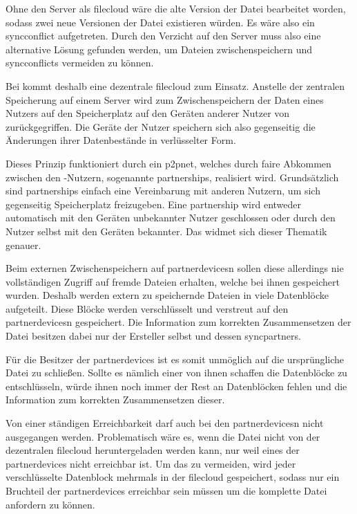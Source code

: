 Ohne den Server als \gls{filecloud} wäre die alte Version der Datei bearbeitet worden, sodass zwei
neue Versionen der Datei existieren würden. Es wäre also ein \gls{syncconflict} aufgetreten.
Durch den Verzicht auf den Server muss also eine alternative Lösung gefunden werden,
um Dateien zwischenspeichern und \glspl{syncconflict} vermeiden zu können.

Bei \sblit kommt deshalb eine dezentrale \gls{filecloud} zum Einsatz. Anstelle
der zentralen Speicherung auf einem Server wird zum Zwischenspeichern der Daten eines
Nutzers auf den Speicherplatz auf den Geräten anderer Nutzer von \sblit zurückgegriffen.
Die Geräte der Nutzer speichern sich also gegenseitig die Änderungen ihrer Datenbestände
in verlüsselter Form.

Dieses Prinzip funktioniert durch ein \gls{p2pnet}, welches durch faire Abkommen zwischen den \sblit-Nutzern,
sogenannte \glspl{partnership}, realisiert wird. Grundsätzlich sind \glspl{partnership} einfach eine
Vereinbarung mit anderen Nutzern, um sich gegenseitig Speicherplatz freizugeben.
Eine \gls{partnership} wird entweder automatisch mit den Geräten unbekannter Nutzer
geschlossen oder durch den Nutzer selbst mit den Geräten bekannter.
Das  widmet sich dieser Thematik genauer.

Beim externen Zwischenspeichern auf \glspl{partnerdevice}n sollen diese allerdings
nie vollständigen Zugriff auf fremde Dateien erhalten, welche bei ihnen gespeichert
wurden. Deshalb werden extern zu speichernde Dateien in viele Datenblöcke aufgeteilt.
Diese Blöcke werden verschlüsselt und verstreut auf den \glspl{partnerdevice}n gespeichert.
Die Information zum korrekten Zusammensetzen der Datei besitzen dabei nur der Ersteller selbst und dessen
\glspl{syncpartner}.

Für die Besitzer der \glspl{partnerdevice} ist es somit unmöglich auf die ursprüngliche
Datei zu schließen. Sollte es nämlich einer von ihnen schaffen die Datenblöcke zu
entschlüsseln, würde ihnen noch immer der Rest an Datenblöcken fehlen und die Information
zum korrekten Zusammensetzen dieser.

Von einer ständigen Erreichbarkeit darf auch bei den \glspl{partnerdevice}n nicht
ausgegangen werden. Problematisch wäre es, wenn die Datei nicht von der dezentralen
\gls{filecloud} heruntergeladen werden kann, nur weil eines der \glspl{partnerdevice}
nicht erreichbar ist. Um das zu vermeiden, wird jeder verschlüsselte Datenblock mehrmals
 in der \gls{filecloud} gespeichert, sodass nur ein Bruchteil der
\glspl{partnerdevice} erreichbar sein müssen um die komplette Datei anfordern zu können.

